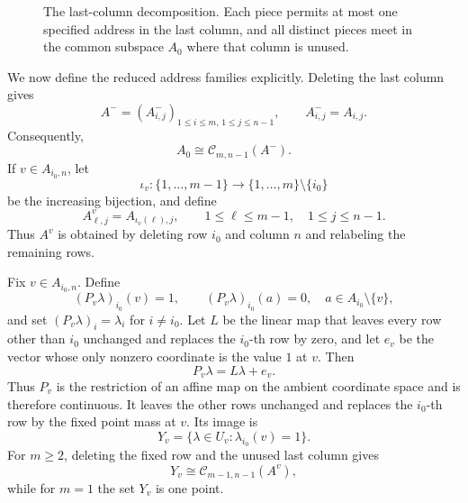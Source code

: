 \documentclass[11pt,reqno]{amsart}
\numberwithin{equation}{section}
\theoremstyle{definition}
\theoremstyle{remark}
\begin{document}
\begin{figure}[htbp]
\centering
{}
\caption{The last-column decomposition.  Each piece permits at most one
specified address in the last column, and all distinct pieces meet in the
common subspace $A_0$ where that column is unused.}
\label{fig:last-column-decomposition}
\end{figure}

We now define the reduced address families explicitly.  Deleting the last
column gives
\[
 A^-=(A^-_{i,j})_{1\le i\le m,\,1\le j\le n-1},
 \qquad A^-_{i,j}=A_{i,j}.
\]
Consequently,
\begin{equation}\label{eq:A0-smaller}
 A_0\cong\mathcal C_{m,n-1}(A^-).
\end{equation}
If $v\in A_{i_0,n}$, let
\[
 \iota_v:\{1,\ldots,m-1\}\longrightarrow
 \{1,\ldots,m\}\setminus\{i_0\}
\]
be the increasing bijection, and define
\[
 A^v_{\ell,j}=A_{\iota_v(\ell),j},
 \qquad 1\le\ell\le m-1,
 \quad 1\le j\le n-1.
\]
Thus $A^v$ is obtained by deleting row $i_0$ and column $n$ and relabeling
the remaining rows.

Fix $v\in A_{i_0,n}$.  Define
\[
 (P_v\lambda)_{i_0}(v)=1,
 \qquad
 (P_v\lambda)_{i_0}(a)=0,
 \quad a\in A_{i_0}\setminus\{v\},
\]
and set $(P_v\lambda)_i=\lambda_i$ for $i\ne i_0$.  Let $L$ be the linear map that leaves every row other than $i_0$
unchanged and replaces the $i_0$-th row by zero, and let $e_v$ be the vector
whose only nonzero coordinate is the value $1$ at $v$.  Then
\[
 P_v\lambda=L\lambda+e_v.
\]
Thus $P_v$ is the restriction of an affine map on the ambient coordinate
space and is therefore continuous.  It leaves the other rows unchanged and
replaces the $i_0$-th row by the fixed point mass at $v$.  Its image is
\[
 Y_v=\{\lambda\in U_v:\lambda_{i_0}(v)=1\}.
\]
For $m\ge2$, deleting the fixed row and the unused last column gives
\begin{equation}\label{eq:Yv-smaller}
 Y_v\cong\mathcal C_{m-1,n-1}(A^v),
\end{equation}
while for $m=1$ the set $Y_v$ is one point.
\end{document}
